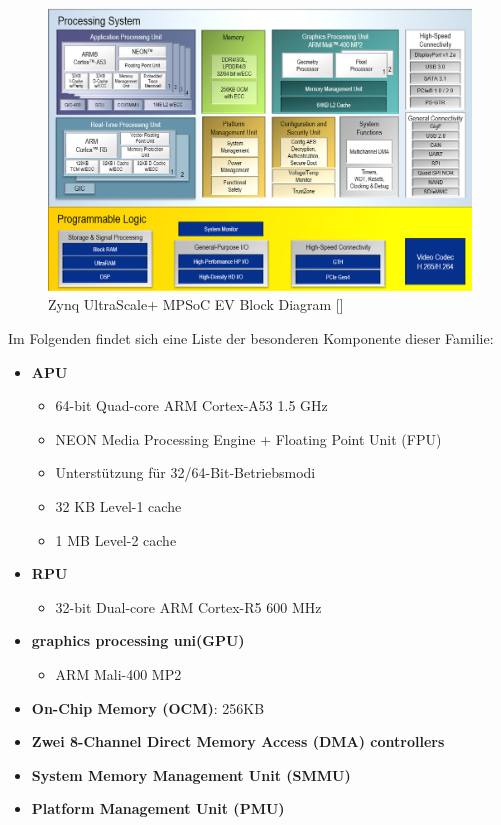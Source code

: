 \begin{figure}[H]
	\begin{center}
		\includegraphics[width=1\textwidth]{./images/zynqmp-blockdiagramm.jpg}
	\end{center}
	\vspace{-5pt}
	\caption[Zynq UltraScale+ MPSoC EV Block Diagram]{Zynq UltraScale+ MPSoC EV Block Diagram [\cite{XilinxInc.}]} %
	\label{fig:zynqmp:block:diagram}
	\vspace{-5pt}
\end{figure}

 Im Folgenden findet sich eine Liste der besonderen Komponente dieser Familie:
 \begin{itemize}
 	\item \textbf{APU}
 	\begin{itemize}
 		\item 64-bit Quad-core ARM Cortex-A53 1.5 GHz
 		\item NEON Media Processing Engine + Floating Point Unit (FPU)
 		\item Unterstützung für 32/64-Bit-Betriebsmodi
 		\item 32 KB Level-1 cache
 		\item 1 MB Level-2 cache
 	\end{itemize}
 	\item \textbf{RPU}
 	\begin{itemize}
 		\item 32-bit Dual-core ARM Cortex-R5  600 MHz
 	\end{itemize}
 	\item \textbf{graphics processing uni(GPU)}
 	\begin{itemize}
 		\item ARM Mali-400 MP2
 	\end{itemize}
 	\item \textbf{On-Chip Memory (OCM)}: 256KB
 	\item \textbf{Zwei 8-Channel Direct Memory Access (DMA) controllers}
 	\item \textbf{System Memory Management Unit (SMMU)}
 	\item \textbf{Platform Management Unit (PMU)}
 \end{itemize}
 
